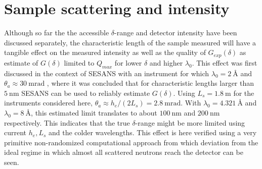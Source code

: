 \section{Sample scattering and intensity}
\label{c4.4}
Although so far the the accessible $\delta$-range and detector intensity have been discussed separately, the characteristic length of the sample measured will have a tangible effect on the measured intensity as well as the quality of $G_{exp}(\delta)$ as estimate of $G(\delta)$ limited to $Q_{max}$ for lower $\delta$ and higher $\lambda_0$. This effect was first discussed in the context of SESANS with an instrument for which $\lambda_0 = \SI{2}{\angstrom}$ and $\theta_a \approx \SI{30}{\milli\radian}$ \cite{rekveldt1996}, where it was concluded that for characteristic lengths larger than $\SI{5}{\nano\meter}$ SESANS can be used to reliably estimate $G(\delta)$. Using $L_s = \SI{1.8}{\meter}$ for the instruments considered here, $\theta_a \approx h_e / (2L_s) = \SI{2.8}{\milli\radian}$. With $\lambda_0 = \SI{4.321}{\angstrom}$ and $\lambda_0 =  \SI{8}{\angstrom}$, this estimated limit translates to about $\SI{100}{\nano\meter}$ and $\SI{200}{\nano\meter}$ respectively. This indicates that the true $\delta$-range might be more limited using current $h_e,L_s$ and the colder wavelengths. This effect is here verified using a very primitive non-randomized computational approach from which deviation from the ideal regime in which almost all scattered neutrons reach the detector \cite{rekveldt1996} can be seen. 
